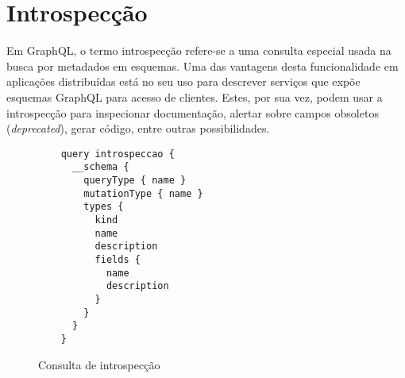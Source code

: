 \section[Introspecção]{Introspecção}

Em GraphQL, o termo introspecção refere-se a uma consulta especial usada na busca por metadados em esquemas. Uma das vantagens desta funcionalidade em aplicações distribuídas está no seu uso para descrever serviços que expõe esquemas GraphQL para acesso de clientes. Estes, por sua vez, podem usar a introspecção para inspecionar documentação, alertar sobre campos obsoletos (\textit{deprecated}), gerar código, entre outras possibilidades.

\begin{figure}[H]
  \centering
  \begin{verbatim}
    query introspeccao {
      __schema {
        queryType { name }
        mutationType { name }
        types {
          kind
          name
          description
          fields {
            name
            description
          }
        }
      }
    }
  \end{verbatim}
  \caption{Consulta de introspecção}
\end{figure}
